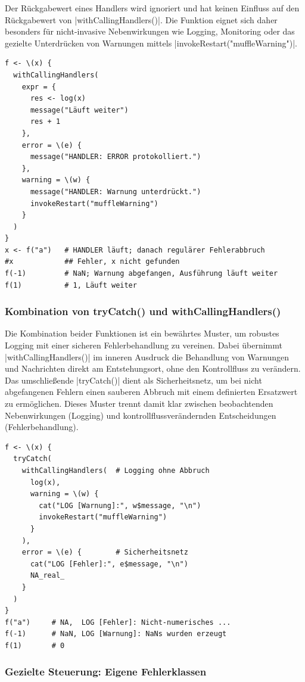 \documentclass[10pt,twocolumn]{scrartcl}
\renewcommand{\lstinline}{\mycoloredinline}
\begin{document}
Der Rückgabewert eines Handlers wird ignoriert und hat keinen Einfluss auf den Rückgabewert von \lstinline|withCallingHandlers()|. Die Funktion eignet sich daher besonders für nicht-invasive Nebenwirkungen wie Logging, Monitoring oder das gezielte Unterdrücken von Warnungen mittels \lstinline|invokeRestart("muffleWarning")|.

\begin{lstlisting}
f <- \(x) {
  withCallingHandlers(
    expr = {
      res <- log(x)
      message("Läuft weiter")
      res + 1
    },
    error = \(e) {
      message("HANDLER: ERROR protokolliert.")
    },
    warning = \(w) {
      message("HANDLER: Warnung unterdrückt.")
      invokeRestart("muffleWarning")
    }
  )
}
x <- f("a")   # HANDLER läuft; danach regulärer Fehlerabbruch
#x            ## Fehler, x nicht gefunden
f(-1)         # NaN; Warnung abgefangen, Ausführung läuft weiter
f(1)          # 1, Läuft weiter
\end{lstlisting}


\subsubsection{Kombination von tryCatch() und withCallingHandlers()}

Die Kombination beider Funktionen ist ein bewährtes Muster, um robustes Logging mit einer sicheren Fehlerbehandlung zu vereinen. Dabei übernimmt \lstinline|withCallingHandlers()| im inneren Ausdruck die Behandlung von Warnungen und Nachrichten direkt am Entstehungsort, ohne den Kontrollfluss zu verändern. Das umschließende \lstinline|tryCatch()| dient als Sicherheitsnetz, um bei nicht abgefangenen Fehlern einen sauberen Abbruch mit einem definierten Ersatzwert zu ermöglichen. Dieses Muster trennt damit klar zwischen beobachtenden Nebenwirkungen (Logging) und kontrollflussverändernden Entscheidungen (Fehlerbehandlung).

\begin{lstlisting}
f <- \(x) {
  tryCatch(
    withCallingHandlers(  # Logging ohne Abbruch
      log(x),
      warning = \(w) {
        cat("LOG [Warnung]:", w$message, "\n")
        invokeRestart("muffleWarning")
      }
    ),
    error = \(e) {        # Sicherheitsnetz
      cat("LOG [Fehler]:", e$message, "\n")
      NA_real_
    }
  )
}
f("a")     # NA,  LOG [Fehler]: Nicht-numerisches ...
f(-1)      # NaN, LOG [Warnung]: NaNs wurden erzeugt
f(1)       # 0
\end{lstlisting}


\subsubsection{Gezielte Steuerung: Eigene Fehlerklassen}
\end{document}
